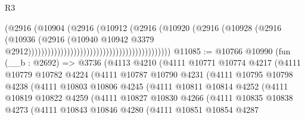 \begin{lexlean}{R3}
\begin{coremodule}
                                                                    (@2916
                                                                      (@10904
                                                                        (@2916
                                                                          (@10912
                                                                            (@2916
                                                                              (@10920
                                                                                (@2916
                                                                                  (@10928
                                                                                    (@2916
                                                                                      (@10936
                                                                                        (@2916
                                                                                          (@10940
                                                                                            @10942
                                                                                            @3379
                                                                                            @2912))))))))))))))))))))))))))))))))))))))))))))
@11085 := @10766
    @10990
    (fun (__b : @2692) =>
    @3736
      (@4113
        @4210
        (@4111
          @10771
          @10774
          @4217
          (@4111
            @10779
            @10782
            @4224
            (@4111
              @10787
              @10790
              @4231
              (@4111
                @10795
                @10798
                @4238
                (@4111
                  @10803
                  @10806
                  @4245
                  (@4111
                    @10811
                    @10814
                    @4252
                    (@4111
                      @10819
                      @10822
                      @4259
                      (@4111
                        @10827
                        @10830
                        @4266
                        (@4111
                          @10835
                          @10838
                          @4273
                          (@4111
                            @10843
                            @10846
                            @4280
                            (@4111
                              @10851
                              @10854
                              @4287

\end{coremodule}
\end{lexlean}
